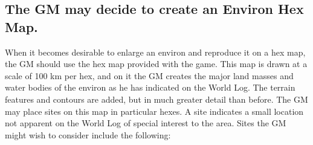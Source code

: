\begin{table}[htbp]
  \centering
\end{table}

\subsection[Environ Hex map]{The GM may decide to create an Environ
  Hex Map.}
\label{sec:environ-hex-map}

When it becomes desirable to enlarge an environ and reproduce it on a
hex map, the GM should use the hex map provided with the game. This
map is drawn at a scale of 100 km per hex, and on it the GM creates
the major land masses and water bodies of the environ as he has
indicated on the World Log. The terrain features and contours are
added, but in much greater detail than before. The GM may place sites
on this map in particular hexes. A site indicates a small location not
apparent on the World Log of special interest to the area. Sites the
GM might wish to consider include the following:

